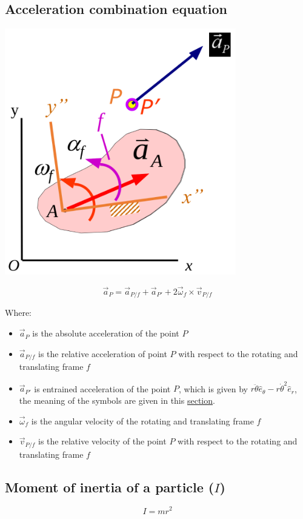 \documentclass[11pt]{article}
\begin{document}
\subsection{Acceleration combination equation}
\label{sec:orgd97b1f2}
\begin{center}
\includegraphics[height=29em]{./images/acceleration-combination-equation-diagram.png}
\end{center}

\[\vec{a}_P = \vec{a}_{P/f} + \vec{a}_{P'} + 2 \vec{\omega}_f \times \vec{v}_{P/f}\]

Where:
\begin{itemize}
\item \(\vec{a}_P\) is the absolute acceleration of the point \(P\)
\item \(\vec{a}_{P/f}\) is the relative acceleration of point \(P\) with respect to the rotating and translating frame \(f\)
\item \(\vec{a}_{P'}\) is entrained acceleration of the point \(P\), which is given by \(r \ddot{\theta} \hat{e}_{\theta} - r \dot{\theta}^2 \hat{e}_r\), the meaning of the symbols are given in this \hyperref[org92f4623]{section}.
\item \(\vec{\omega}_f\) is the angular velocity of the rotating and translating frame \(f\)
\item \(\vec{v}_{P/f}\) is the relative velocity of the point \(P\) with respect to the rotating and translating frame \(f\)
\end{itemize}
\subsection{Moment of inertia of a particle (\(I\))}
\label{sec:org7abe859}
\[I = mr^2\]
\end{document}
